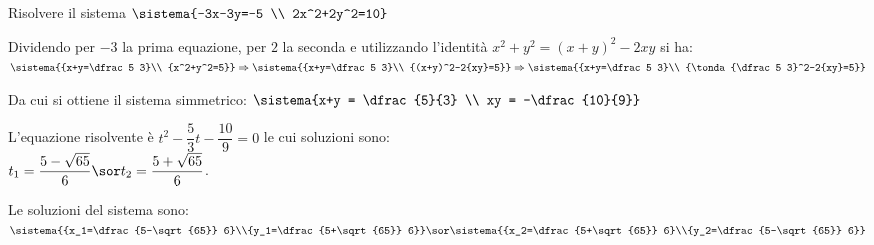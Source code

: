 \begin{esempio}{}{}
Risolvere il sistema \quad 
\(\sistema{-3x-3y=-5 \\ 2x^2+2y^2=10}\)

Dividendo per \(-3\) la prima equazione, per \(2\) la seconda e 
utilizzando l'identità \(x^2+y^2=(x+y)^2-2{xy}\) 
si ha: \quad 
\(\sistema{{x+y=\dfrac 5 3}\\
{x^2+y^2=5}}
\Rightarrow \sistema{{x+y=\dfrac 5 3}\\
{(x+y)^2-2{xy}=5}}
\Rightarrow \sistema{{x+y=\dfrac 5 3}\\
{\tonda{\dfrac 5 3}^2-2{xy}=5}}\)

Da cui si ottiene il sistema simmetrico: \quad 
\(\sistema{x+y = \dfrac{5}{3} \\ xy = -\dfrac{10}{9}}\)

L'equazione risolvente è \(t^2-\dfrac{5}{3}t-\dfrac{10}{9} = 0\) le cui 
soluzioni sono:\\ 
\(t_1 = \dfrac{5-\sqrt{65}}{6} \sor t_2 = \dfrac{5+\sqrt{65}}{6}\).

Le soluzioni del sistema sono: 
\(\sistema{{x_1=\dfrac{5-\sqrt{65}} 
6}\\{y_1=\dfrac{5+\sqrt{65}} 
6}} \sor \sistema{{x_2=\dfrac{5+\sqrt{65}} 
6}\\{y_2=\dfrac{5-\sqrt{65}} 6}}\)
\end{esempio}


